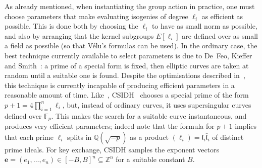 \documentclass{llncs}
\newcommand{\F}{\mathbb{F}}
\newcommand{\OO}{\mathcal{O}}
\newcommand{\Q}{\mathbb{Q}}
\newcommand{\Z}{\mathbb{Z}}
\DeclareMathOperator{\Cl}{Cl}
\renewcommand{\l}{\mathfrak{l}}
\newcommand{\e}{\mathbf{e}}
\begin{document}
As already mentioned, when instantiating the group action in practice, one must choose parameters that make evaluating isogenies of degree $\ell_i$ as efficient as possible.
This is done both by choosing the $\ell_i$ to have as small norm as possible, and also by arranging that the kernel subgroups $E[ \ell_i ]$ are defined over as small a field as possible (so that V\'elu's formulas can be used).
In the ordinary case, the best technique currently available to select parameters is due to De~Feo, Kieffer and Smith~\cite{DFKS18}: a prime of a special form is fixed, then elliptic curves are taken at random until a suitable one is found.
Despite the optimisations described in~\cite{DFKS18}, this technique is currently incapable of producing efficient parameters in a reasonable amount of time.
Like~\cite{DFKS18}, CSIDH~\cite{CLMPR18} chooses a special prime of the form $p+1 = 4\prod_{i=1}^n\ell_i$, but, instead of ordinary curves, it uses supersingular curves defined over $\F_p$.
This makes the search for a suitable curve instantaneous, and produces very efficient parameters; indeed note that the formula for $p+1$ implies
that each prime $\ell_i$ splits in $\Q(\sqrt{-p})$ as a product $(\ell_i) = \l_i \bar{\l}_i$ of distinct prime ideals.
For key exchange, CSIDH samples the exponent vectors $\e = (e_1, \dots, e_n) \in [-B,B]^n \subseteq \Z^n$ for a suitable constant $B$.
\end{document}
